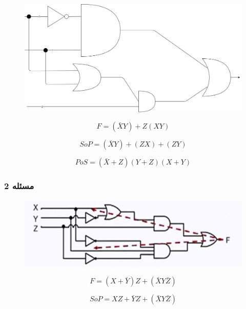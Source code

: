 \documentclass[20pt, a4paper]{article}
\begin{document}
\begin{figure}[htbp]\centering
	\centerline{\includegraphics[width=350pt]{img/analyze/m1.png}}
\end{figure}

\begin{equation}
	F = (\bar{X}Y)+Z(XY)
\end{equation}

\begin{equation}
	SoP= (\bar{X}Y)+(ZX) + (ZY)
\end{equation}

\begin{equation}
	PoS= (\bar{X}+Z)(Y+Z)(X+Y)
\end{equation}

\newpage

\subsubsection{مسئله 2}

\begin{figure}[htbp]\centering
	\centerline{\includegraphics[width=350pt]{img/analyze/m2.jpg}}
\end{figure}

\begin{equation}
	F = (X+\bar{Y})Z+(\bar{X}Y\bar{Z})
\end{equation}

\begin{equation}
	SoP= XZ+\bar{Y}Z+(\bar{X}Y\bar{Z})
\end{equation}
\end{document}
